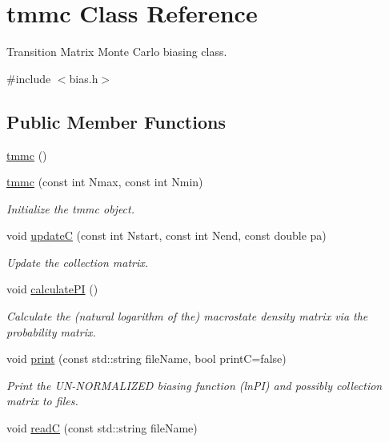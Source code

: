 \hypertarget{classtmmc}{}\section{tmmc Class Reference}
\label{classtmmc}


Transition Matrix Monte Carlo biasing class.  




{\ttfamily \#include $<$bias.\+h$>$}

\subsection*{Public Member Functions}
\begin{DoxyCompactItemize}
\item 
\hyperlink{classtmmc_a2dd6a666daae3a9b7c3978d8ecff887e}{tmmc} ()
\item 
\hyperlink{classtmmc_a643b39f7bd100470c9c632bc9ea7e45e}{tmmc} (const int Nmax, const int Nmin)
\begin{DoxyCompactList}\small\item\em Initialize the tmmc object. \end{DoxyCompactList}\item 
void \hyperlink{classtmmc_ab648f1ba2767c07fdccf9ac0e2eec8f6}{update\+C} (const int Nstart, const int Nend, const double pa)
\begin{DoxyCompactList}\small\item\em Update the collection matrix. \end{DoxyCompactList}\item 
void \hyperlink{classtmmc_a8e065523e9cc3c9628f91d3804cd201e}{calculate\+P\+I} ()
\begin{DoxyCompactList}\small\item\em Calculate the (natural logarithm of the) macrostate density matrix via the probability matrix. \end{DoxyCompactList}\item 
void \hyperlink{classtmmc_a059a91f0f2ebe78671b5f4fb8e1ab853}{print} (const std\+::string file\+Name, bool print\+C=false)
\begin{DoxyCompactList}\small\item\em Print the U\+N-\/\+N\+O\+R\+M\+A\+L\+I\+Z\+E\+D biasing function (ln\+P\+I) and possibly collection matrix to files. \end{DoxyCompactList}\item 
void \hyperlink{classtmmc_a7d9ee0505dc801cbff55bc35c3654a61}{read\+C} (const std\+::string file\+Name)

\end{DoxyCompactItemize}
